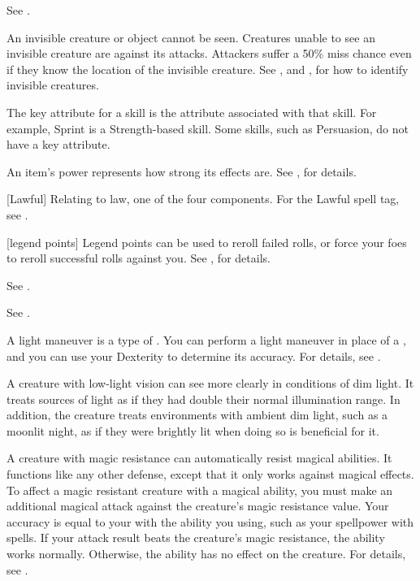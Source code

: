  See .

 An invisible creature or object cannot be seen. Creatures unable to see an invisible creature are  against its attacks. Attackers suffer a 50\% miss chance even if they know the location of the invisible creature. See , and , for how to identify invisible creatures.

 The key attribute for a skill is the attribute associated with that skill.
For example, Sprint is a Strength-based skill.
Some skills, such as Persuasion, do not have a key attribute.

 An item's power represents how strong its effects are.
See , for details.

[Lawful] Relating to law, one of the four  components. For the Lawful spell tag, see .

[legend points] Legend points can be used to reroll failed rolls, or force your foes to reroll successful rolls against you. See , for details.

 See .

 See .

 A light maneuver is a type of .
You can perform a light maneuver in place of a , and you can use your Dexterity to determine its accuracy.
For details, see .

 A creature with low-light vision can see more clearly in conditions of dim light.
It treats sources of light as if they had double their normal illumination range.
In addition, the creature treats environments with ambient dim light, such as a moonlit night, as if they were brightly lit when doing so is beneficial for it.

 A creature with magic resistance can automatically resist magical abilities.
It functions like any other defense, except that it only works against magical effects.
To affect a magic resistant creature with a magical ability, you must make an additional magical attack against the creature's magic resistance value.
Your accuracy is equal to your  with the ability you using, such as your spellpower with spells.
If your attack result beats the creature's magic resistance, the ability works normally.
Otherwise, the ability has no effect on the creature.
For details, see .


